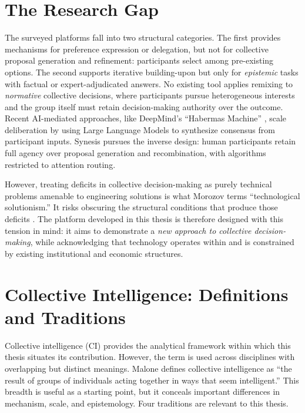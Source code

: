 \documentclass[a4paper, 12pt, twoside]{iviathesis}
\begin{document}
\section{The Research Gap}
\label{sec:research-gap}
The surveyed platforms fall into two structural categories. The first provides mechanisms for preference expression or delegation, but not for collective proposal generation and refinement: participants select among pre-existing options. The second supports iterative building-upon but only for \textit{epistemic} tasks with factual or expert-adjudicated answers. No existing tool applies remixing to \textit{normative} collective decisions, where participants pursue heterogeneous interests and the group itself must retain decision-making authority over the outcome. Recent AI-mediated approaches, like DeepMind's ``Habermas Machine'' \cite{tessler2024habermas}, scale deliberation by using Large Language Models to synthesize consensus from participant inputs. Synesis pursues the inverse design: human participants retain full agency over proposal generation and recombination, with algorithms restricted to attention routing.

However, treating deficits in collective decision-making as purely technical problems amenable to engineering solutions is what Morozov \cite{morozov2013save} terms ``technological solutionism.'' It risks obscuring the structural conditions that produce those deficits \cite{winner1980}. The platform developed in this thesis is therefore designed with this tension in mind: it aims to demonstrate a \textit{new approach to collective decision-making}, while acknowledging that technology operates within and is constrained by existing institutional and economic structures.

\section{Collective Intelligence: Definitions and Traditions}
\label{sec:ci-framework}

Collective intelligence (CI) provides the analytical framework within which this thesis situates its contribution. However, the term is used across disciplines with overlapping but distinct meanings. Malone \cite{malone2018superminds} defines collective intelligence as ``the result of groups of individuals acting together in ways that seem intelligent.'' This breadth is useful as a starting point, but it conceals important differences in mechanism, scale, and epistemology. Four traditions are relevant to this thesis.
\end{document}
